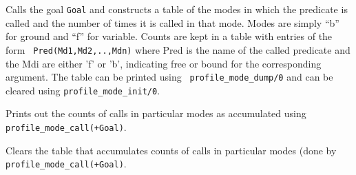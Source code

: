 \begin{description}

Calls the goal {\tt Goal} and constructs a table of the modes in which
the predicate is called and the number of times it is called in that
mode.  Modes are simply ``b'' for ground and ``f'' for variable.
Counts are kept in a table with entries of the form {\tt
Pred(Md1,Md2,..,Mdn)} where Pred is the name of the called predicate
and the Mdi are either 'f' or 'b', indicating free or bound for the
corresponding argument.  The table can be printed using {\tt
profile\_mode\_dump/0} and can be cleared using {\tt profile\_mode\_init/0}.
\end{description}

\begin{description}

Prints out the counts of calls in particular modes as accumulated using \\
{\tt profile\_mode\_call(+Goal)}.
\end{description}

\begin{description}

Clears the table that accumulates counts of calls in particular modes
(done by\\ {\tt profile\_mode\_call(+Goal)}.
\end{description}


